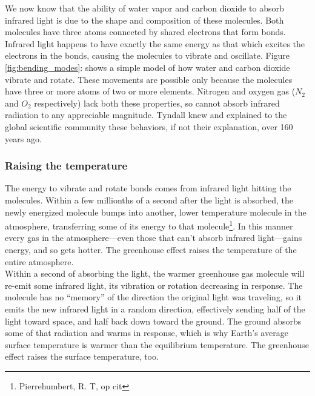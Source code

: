 We now know that the ability of water vapor and carbon dioxide to absorb infrared light is due to the shape and composition of these molecules. Both molecules have three atoms connected by shared electrons that form bonds. Infrared light happens to have exactly the same energy as that which excites the electrons in the bonds, causing the molecules to vibrate and oscillate. Figure \ref{fig:bending_modes}: shows a simple model of how water and carbon dioxide vibrate and rotate. These movements are possible only because the molecules have three or more atoms of two or more elements. Nitrogen and oxygen gas ($N_2$ and $O_2$ respectively) lack both these properties, so cannot absorb infrared radiation to any appreciable magnitude. Tyndall knew and explained to the global scientific community these behaviors, if not their explanation, over 160 years ago.\\ 
\subsubsection{Raising the temperature}
The energy to vibrate and rotate bonds comes from infrared light hitting the molecules. Within a few millionths of a second after the light is absorbed, the newly energized molecule bumps into another, lower temperature molecule in the atmosphere, transferring some of its energy to that molecule\footnote{Pierrehumbert, R. T, op cit}. In this manner every gas in the atmosphere---even those that can't absorb infrared light---gains energy, and so gets hotter. The greenhouse effect raises the temperature of the entire atmosphere.\\
Within a second of absorbing the light, the warmer greenhouse gas molecule will re-emit some infrared light, its vibration or rotation decreasing in response. The molecule has no ``memory'' of the direction the original light was traveling, so it emits the new infrared light in a random direction, effectively sending half of the light toward space, and half back down toward the ground. The ground absorbs some of that radiation and warms in response, which is why Earth's average surface temperature is warmer than the equilibrium temperature. The greenhouse effect raises the surface temperature, too.\\

